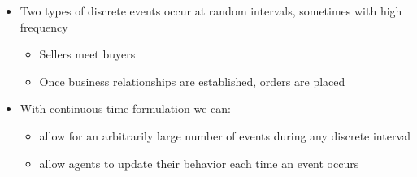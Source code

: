 \documentclass[notes=show]{beamer}
\begin{document}
\begin{frame}%


\begin{itemize}
\item Two types of discrete events occur at random intervals, sometimes with
high frequency

\begin{itemize}
\item Sellers meet buyers

\item Once business relationships are established, orders are placed
\end{itemize}

\item With continuous time formulation we can:

\begin{itemize}
\item allow for an arbitrarily large number of events during any discrete
interval

\item allow agents to update their behavior each time an event occurs
\end{itemize}
\end{itemize}

\end{frame}%
\end{document}
